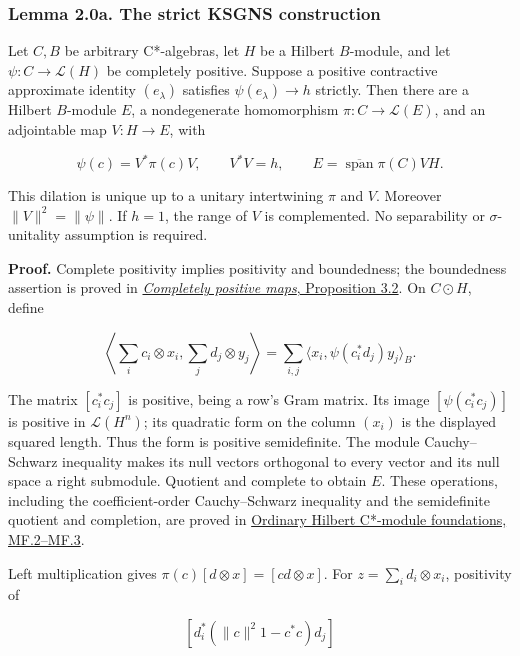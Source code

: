\documentclass[
  11pt,
]{article}
\begin{document}
\subsubsection{Lemma 2.0a. The strict KSGNS
construction}\label{lemma-2.0a.-the-strict-ksgns-construction}

Let \(C,B\) be arbitrary C*-algebras, let \(H\) be a Hilbert
\(B\)-module, and let \(\psi:C\to\mathcal L(H)\) be completely positive.
Suppose a positive contractive approximate identity \((e_\lambda)\)
satisfies \(\psi(e_\lambda)\to h\) strictly. Then there are a Hilbert
\(B\)-module \(E\), a nondegenerate homomorphism
\(\pi:C\to\mathcal L(E)\), and an adjointable map \(V:H\to E\), with

\[
\psi(c)=V^*\pi(c)V,\qquad V^*V=h,\qquad
E=\overline{\operatorname{span}}\pi(C)VH.
\]

This dilation is unique up to a unitary intertwining \(\pi\) and \(V\).
Moreover \(\|V\|^2=\|\psi\|\). If \(h=1\), the range of \(V\) is
complemented. No separability or \(\sigma\)-unitality assumption is
required.

\textbf{Proof.} Complete positivity implies positivity and boundedness;
the boundedness assertion is proved in
\href{https://kokunoyumeto.github.io/open-math-courses/courses/foundations-of-von-neumann-algebras/completely-positive-maps.html}{\emph{Completely
positive maps}, Proposition 3.2}. On \(C\odot H\), define

\[
\left\langle\sum_i c_i\otimes x_i,\sum_j d_j\otimes y_j\right\rangle
=\sum_{i,j}\langle x_i,\psi(c_i^*d_j)y_j\rangle_B.
\]

The matrix \([c_i^*c_j]\) is positive, being a row's Gram matrix. Its
image \([\psi(c_i^*c_j)]\) is positive in \(\mathcal L(H^n)\); its
quadratic form on the column \((x_i)\) is the displayed squared length.
Thus the form is positive semidefinite. The module Cauchy--Schwarz
inequality makes its null vectors orthogonal to every vector and its
null space a right submodule. Quotient and complete to obtain \(E\).
These operations, including the coefficient-order Cauchy--Schwarz
inequality and the semidefinite quotient and completion, are proved in
\href{supporting/hilbert-c-star-modules-and-morita-equivalence/hilbert-module-foundations.html\#mf-002}{Ordinary
Hilbert C*-module foundations, MF.2--MF.3}.

Left multiplication gives \(\pi(c)[d\otimes x]=[cd\otimes x]\). For
\(z=\sum_i d_i\otimes x_i\), positivity of

\[
[d_i^*(\|c\|^2 1-c^*c)d_j]
\]
\end{document}
